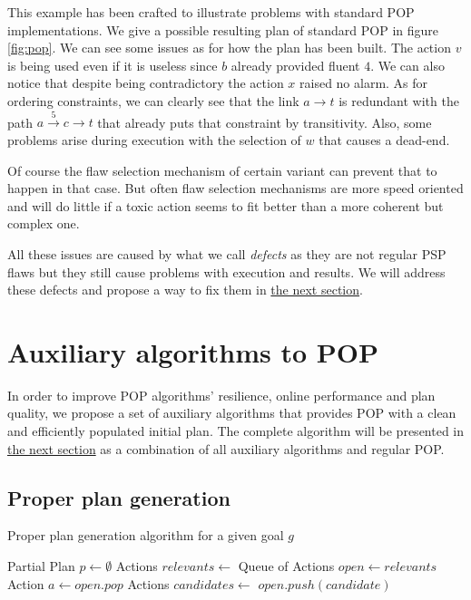 \documentclass[]{article}
\begin{document}
This example has been crafted to illustrate problems with standard POP
implementations. We give a possible resulting plan of standard POP in
figure \ref{fig:pop}. We can see some issues as for how the plan has
been built. The action \(v\) is being used even if it is useless since
\(b\) already provided fluent \(4\). We can also notice that despite
being contradictory the action \(x\) raised no alarm. As for ordering
constraints, we can clearly see that the link \(a \to t\) is redundant
with the path \(a \xrightarrow{5} c \to t\) that already puts that
constraint by transitivity. Also, some problems arise during execution
with the selection of \(w\) that causes a dead-end.

Of course the flaw selection mechanism of certain variant can prevent
that to happen in that case. But often flaw selection mechanisms are
more speed oriented and will do little if a toxic action seems to fit
better than a more coherent but complex one.

All these issues are caused by what we call \emph{defects} as they are
not regular PSP flaws but they still cause problems with execution and
results. We will address these defects and propose a way to fix them in
\protect\hyperlink{defects}{the next section}.

\section{Auxiliary algorithms to POP}\label{auxiliary-algorithms-to-pop}

In order to improve POP algorithms' resilience, online performance and
plan quality, we propose a set of auxiliary algorithms that provides POP
with a clean and efficiently populated initial plan. The complete
algorithm will be presented in \protect\hyperlink{soda}{the next
section} as a combination of all auxiliary algorithms and regular POP.

\subsection{Proper plan generation}\label{proper-plan-generation}

\begin{algorithm}\caption{Proper plan generation algorithm for a given goal $g$}\label{properplan}\begin{algorithmic}[1]

 \State Partial Plan
\(p \gets \emptyset\) \State Actions \(relevants \gets\)
\State Queue of Actions \(open \gets relevants\)
 \State Action \(a\gets open.pop\)
\State Actions \(candidates \gets\) 
 
\State \(open.push(candidate)\) \EndIf
        \EndFor
    \EndWhile
\EndFunction

\end{algorithmic}\end{algorithm}
\end{document}
